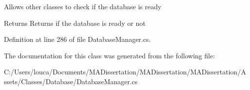 Allows other classes to check if the database is ready 

\begin{DoxyReturn}{Returns}
Returns if the database is ready or not
\end{DoxyReturn}


Definition at line 286 of file Database\+Manager.\+cs.



The documentation for this class was generated from the following file\+:\begin{DoxyCompactItemize}
\item 
C\+:/\+Users/louca/\+Documents/\+M\+A\+Dissertation/\+M\+A\+Dissertation/\+M\+A\+Dissertation/\+Assets/\+Classes/\+Database/Database\+Manager.\+cs\end{DoxyCompactItemize}
